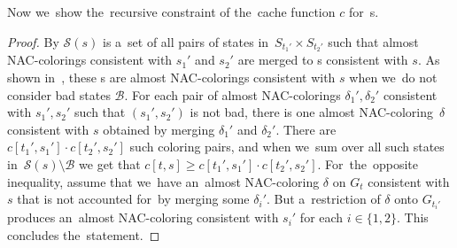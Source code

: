 Now we~show the~recursive constraint of the~cache function \( c \) for~\JoinNode{}s.
%
%
%
\begin{proof}
	By 
	\( \mathcal{S}(s) \) is a~set of
	all pairs of states in~\( S_{t_1'} \times S_{t_2'} \)
	such that almost NAC-colorings consistent with \( s_1' \) and \( s_2' \)
	are merged to \rbcol{}s consistent with \( s \).
	As shown in~,
	these \rbcol{}s are almost NAC-colorings consistent with \( s \)
	when we~do not consider bad states \( \mathcal{B} \).
	For each pair of almost NAC-colorings \( \delta_1', \delta_2' \)
	consistent with \( s_1', s_2' \) such that \( (s_1', s_2') \) is not bad,
	there is one almost NAC-coloring~\( \delta \) consistent with \( s \)
	obtained by merging \( \delta_1' \) and \( \delta_2' \).
	There are \( c[t_1', s_1'] \cdot c[t_2', s_2'] \) such coloring pairs, and
	when we~sum over all such states in~\( \mathcal{S}(s) \setminus \mathcal{B} \)
	we get that \( c[t, s] \ge c[t_1', s_1'] \cdot c[t_2', s_2'] \).
	For~the~opposite inequality, assume that we~have
	an~almost NAC-coloring \( \delta \) on \( G_t \) consistent with \( s \)
	that is not accounted for~by merging some \( \delta_i' \).
	But a~restriction of \( \delta \) onto \( G_{t_i'} \) produces an~almost NAC-coloring
	consistent with \( s_i' \) for each \( i \in \{1,2\} \).
	This concludes the~statement.
\end{proof}
%

